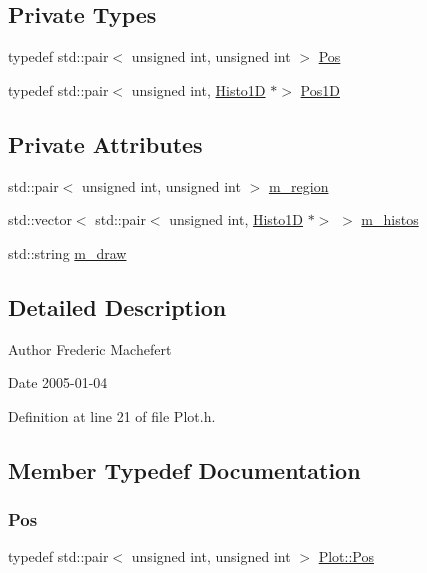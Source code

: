 \subsection*{Private Types}
\begin{DoxyCompactItemize}
\item 
typedef std\+::pair$<$ unsigned int, unsigned int $>$ \hyperlink{classPlot_a07543869c4a57b91ea0ec9835cb165ca}{Pos}
\item 
typedef std\+::pair$<$ unsigned int, \hyperlink{classHisto1D}{Histo1D} $\ast$$>$ \hyperlink{classPlot_ac411abcbcce315d4e77094393e6ca418}{Pos1D}
\end{DoxyCompactItemize}
\subsection*{Private Attributes}
\begin{DoxyCompactItemize}
\item 
std\+::pair$<$ unsigned int, unsigned int $>$ \hyperlink{classPlot_aabcbba1cfc66babcbcd647fdf90cdbf1}{m\+\_\+region}
\item 
std\+::vector$<$ std\+::pair$<$ unsigned int, \hyperlink{classHisto1D}{Histo1D} $\ast$$>$ $>$ \hyperlink{classPlot_a7edebf2b275223b8ce55f6ef3b2da0cc}{m\+\_\+histos}
\item 
std\+::string \hyperlink{classPlot_a83ffbf3effe6a2f8befa6375882f3994}{m\+\_\+draw}
\end{DoxyCompactItemize}


\subsection{Detailed Description}
\begin{DoxyAuthor}{Author}
Frederic Machefert 
\end{DoxyAuthor}
\begin{DoxyDate}{Date}
2005-\/01-\/04 
\end{DoxyDate}


Definition at line 21 of file Plot.\+h.



\subsection{Member Typedef Documentation}
\mbox{\label{classPlot_a07543869c4a57b91ea0ec9835cb165ca}} 
\subsubsection{\texorpdfstring{Pos}{Pos}}
{\footnotesize\ttfamily typedef std\+::pair$<$ unsigned int, unsigned int $>$ \hyperlink{classPlot_a07543869c4a57b91ea0ec9835cb165ca}{Plot\+::\+Pos}\hspace{0.3cm}{\ttfamily [private]}}



